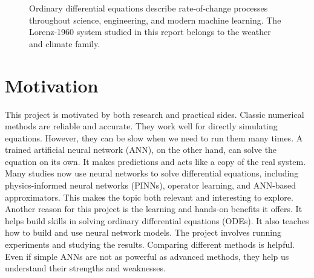 \begin{figure}[ht]
\centering
{}
\caption{Ordinary differential equations describe rate-of-change processes throughout science, engineering, and modern machine learning. The Lorenz-1960 system studied in this report belongs to the weather and climate family.}
\label{fig:ode_landscape}
\end{figure}

\section{Motivation}
This project is motivated by both research and practical sides. Classic numerical methods are reliable and accurate. They work well for directly simulating equations. However, they can be slow when we need to run them many times. A trained artificial neural network (ANN), on the other hand, can solve the equation on its own. It makes predictions and acts like a copy of the real system. Many studies now use neural networks to solve differential equations, including physics-informed neural networks (PINNs), operator learning, and ANN-based approximators. This makes the topic both relevant and interesting to explore. Another reason for this project is the learning and hands-on benefits it offers. It helps build skills in solving ordinary differential equations (ODEs). It also teaches how to build and use neural network models. The project involves running experiments and studying the results. Comparing different methods is helpful. Even if simple ANNs are not as powerful as advanced methods, they help us understand their strengths and weaknesses.



